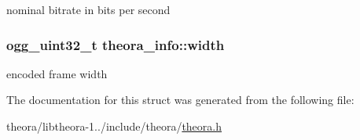 nominal bitrate in bits per second \hypertarget{structtheora__info_a17c2fc651bb3329f1ea6b13ff1d3957b}{
\subsubsection[{width}]{\setlength{\rightskip}{0pt plus 5cm}ogg\+\_\+uint32\+\_\+t theora\+\_\+info\+::width}}\label{structtheora__info_a17c2fc651bb3329f1ea6b13ff1d3957b}
encoded frame width 

The documentation for this struct was generated from the following file\+:\begin{DoxyCompactItemize}
\item 
theora/libtheora-\/1../include/theora/\hyperlink{theora_8h}{theora.\+h}\end{DoxyCompactItemize}
